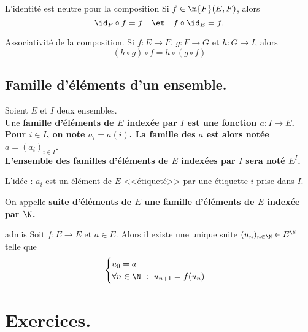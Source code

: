 \documentclass[11pt]{article}
\begin{document}
\begin{prop}{L'identité est neutre pour la composition}{}
    Si $f\in\m{F}(E,F)$, alors
    \begin{equation*}
        \id_F\circ f = f\quad\et\quad f\circ\id_E=f.
    \end{equation*}
\end{prop}

\begin{prop}{Associativité de la composition.}{}
    Si $f:E\to F$, $g:F\to G$ et $h:G\to I$, alors
    \begin{equation*}
        (h\circ g)\circ f=h\circ(g\circ f)
    \end{equation*}
\end{prop}


\subsection{Famille d'éléments d'un ensemble.}

\begin{defi}{}{}
    Soient $E$ et $I$ deux ensembles.\\
    Une \bf{famille d'éléments de $E$ indexée par $I$} est une fonction $a:I\to E$.\\
    Pour $i\in I$, on note $a_i=a(i)$. La famille des $a$ est alors notée $a=(a_i)_{i\in I}$.\\
    L'ensemble des familles d'éléments de $E$ indexées par $I$ sera noté $E^I$.
\end{defi}
L'idée : $a_i$ est un élément de $E$ <<étiqueté>> par une étiquette $i$ prise dans $I$.

\begin{defi}{}{}
    On appelle \bf{suite} d'éléments de $E$ une famille d'éléments de $E$ indexée par $\N$.
\end{defi}

\begin{prop}{admis}{}
    Soit $f:E\to E$ et $a\in E$. Alors il existe une unique suite $(u_n)_{n\in\N}\in E^\N$ telle que
    \begin{equation*}
        \begin{cases}
            u_0=a\\
            \forall n \in \N ~ : ~ u_{n+1}=f(u_n)
        \end{cases}
    \end{equation*}
\end{prop}

\section{Exercices.}
\end{document}
